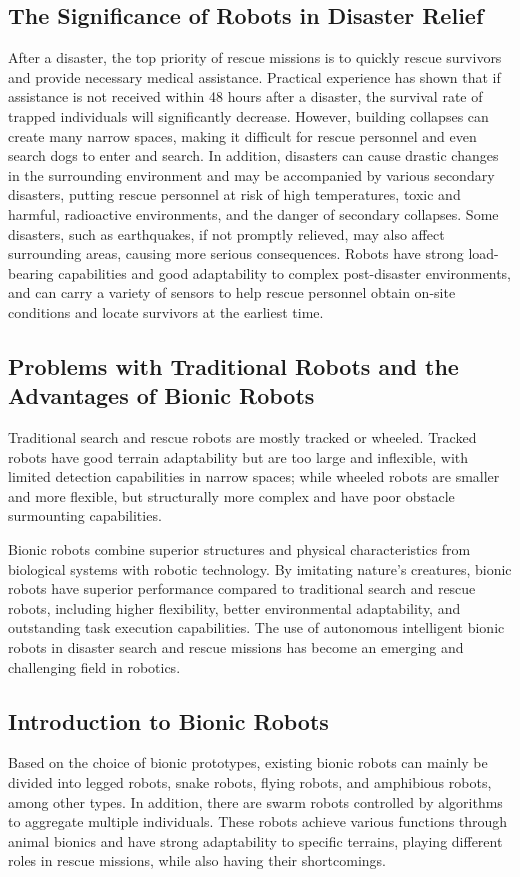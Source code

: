 \documentclass[conference]{IEEEtran}
\begin{document}
\subsection{The Significance of Robots in Disaster Relief}
After a disaster, the top priority of rescue missions is to quickly rescue survivors and provide necessary medical assistance. Practical experience has shown that if assistance is not received within 48 hours after a disaster, the survival rate of trapped individuals will significantly decrease\cite{b25}. However, building collapses can create many narrow spaces, making it difficult for rescue personnel and even search dogs to enter and search. In addition, disasters can cause drastic changes in the surrounding environment and may be accompanied by various secondary disasters, putting rescue personnel at risk of high temperatures, toxic and harmful, radioactive environments, and the danger of secondary collapses. Some disasters, such as earthquakes, if not promptly relieved, may also affect surrounding areas, causing more serious consequences\cite{b26}. Robots have strong load-bearing capabilities and good adaptability to complex post-disaster environments, and can carry a variety of sensors to help rescue personnel obtain on-site conditions and locate survivors at the earliest time\cite{b27}.

\subsection{Problems with Traditional Robots and the Advantages of Bionic Robots}
Traditional search and rescue robots are mostly tracked or wheeled. Tracked robots have good terrain adaptability but are too large and inflexible, with limited detection capabilities in narrow spaces; while wheeled robots are smaller and more flexible, but structurally more complex and have poor obstacle surmounting capabilities\cite{b28}.

Bionic robots combine superior structures and physical characteristics from biological systems with robotic technology\cite{b29}. By imitating nature's creatures, bionic robots have superior performance compared to traditional search and rescue robots, including higher flexibility, better environmental adaptability, and outstanding task execution capabilities. The use of autonomous intelligent bionic robots in disaster search and rescue missions has become an emerging and challenging field in robotics\cite{b30}.

\subsection{Introduction to Bionic Robots}
Based on the choice of bionic prototypes, existing bionic robots can mainly be divided into legged robots, snake robots, flying robots, and amphibious robots, among other types. In addition, there are swarm robots controlled by algorithms to aggregate multiple individuals. These robots achieve various functions through animal bionics and have strong adaptability to specific terrains, playing different roles in rescue missions, while also having their shortcomings.
\end{document}

